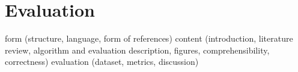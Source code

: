 \documentclass{article}
\begin{document}
\section{Evaluation}

form (structure, language, form of references)
content (introduction, literature review, algorithm and
evaluation description, figures, comprehensibility, correctness)
evaluation (dataset, metrics, discussion)
\end{document}

